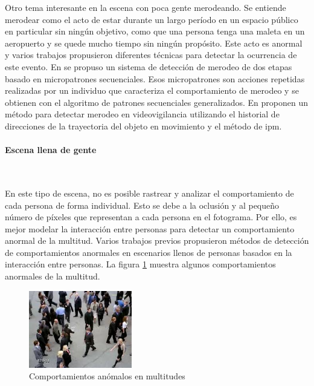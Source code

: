 Otro tema interesante en la escena con poca gente merodeando. Se entiende merodear como el acto de estar durante un largo período en un espacio público en particular sin ningún objetivo, como que una persona tenga una maleta en un aeropuerto y se quede mucho tiempo sin ningún propósito. Este acto es anormal y varios trabajos propusieron diferentes técnicas para detectar la ocurrencia de este evento. En \cite{10.1007/978-3-319-18914-7_54} se propuso un sistema de detección de merodeo de dos etapas basado en micropatrones secuenciales. Esos micropatrones son acciones repetidas realizadas por un individuo que caracteriza el comportamiento de merodeo y se obtienen con el algoritmo de patrones secuenciales generalizados. En \cite{6959931} proponen un método para detectar merodeo en videovigilancia utilizando el historial de direcciones de la trayectoria del objeto en movimiento y el método de \gls{ipm}.

\paragraph*{Escena llena de gente}\mbox{} \\
\label{parag:escena-llena-gente}

En este tipo de escena, no es posible rastrear y analizar el comportamiento de cada persona de forma individual. Esto se debe a la oclusión y al pequeño número de píxeles que representan a cada persona en el fotograma. Por ello, es mejor modelar la interacción entre personas para detectar un comportamiento anormal de la multitud. Varios trabajos previos propusieron métodos de detección de comportamientos anormales en escenarios llenos de personas basados en la interacción entre personas. La figura \ref{fig:abnormal-behaviors-crowded-scene} muestra algunos comportamientos anormales de la multitud.

\begin{figure}[ht]
\centering
\includegraphics[width=0.4\textwidth]{img/chapters/estado-del-arte/abnormal-behaviors-crowded-scene.jpg}
\caption{\label{fig:abnormal-behaviors-crowded-scene}Comportamientos anómalos en multitudes}
\end{figure}

